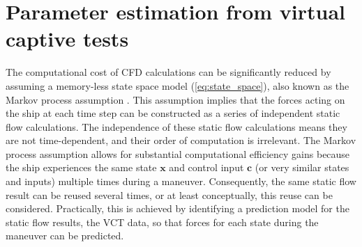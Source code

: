 \section{Parameter estimation from virtual captive tests} \label{sec:VCT}
The computational cost of CFD calculations can be significantly reduced by assuming a memory-less state space model (\autoref{eq:state_space}), also known as the Markov process assumption \cite{yoonIdentificationHydrodynamicCoefficients2003}. This assumption implies that the forces acting on the ship at each time step can be constructed as a series of independent static flow calculations.
The independence of these static flow calculations means they are not time-dependent, and their order of computation is irrelevant. The Markov process assumption allows for substantial computational efficiency gains because the ship experiences the same state $\mathbf{x}$ and control input $\mathbf{c}$ (or very similar states and inputs) multiple times during a maneuver. Consequently, the same static flow result can be reused several times, or at least conceptually, this reuse can be considered. Practically, this is achieved by identifying a prediction model for the static flow results, the VCT data, so that forces for each state during the maneuver can be predicted.

